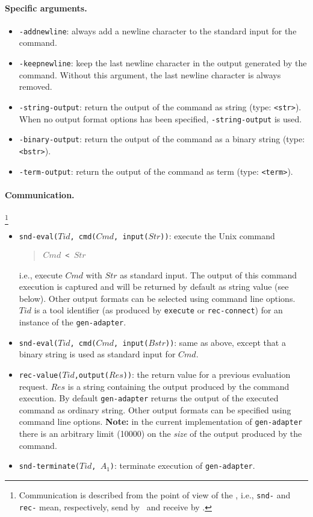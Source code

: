 \paragraph{Specific arguments.}
\begin{itemize}
\item {\tt -addnewline}: always add a newline character to the standard input for the command.
\item {\tt -keepnewline}: keep the last newline character
in the output generated by the command. Without this argument, 
the last newline character is always removed.
\item \texttt{-string-output}: return the output of the command as string
(type: \texttt{<str>}). When no output format options has been specified,
\texttt{-string-output} is used.
\item {\tt -binary-output}: return the output of the command
as a binary string (type: {\tt <bstr>}).
\item \texttt{-term-output}: return the output of the command as term (type:
\texttt{<term>}).
\end{itemize}

\paragraph{Communication.}  \hspace{-0.3cm}\footnote{Communication is described
from the point of view of the \TB, i.e., {\tt snd-} and {\tt rec-}
mean, respectively, send by \TB\ and receive by \TB.}

\begin{itemize}
\item {\tt snd-eval($Tid$, cmd($Cmd$, input($Str$))}: execute the Unix command
\begin{quote}
	{\tt $Cmd$ < $Str$}
\end{quote}
i.e., execute $Cmd$ with $Str$ as standard input. The output of this command execution
is captured and will be returned by default as string value (see below).
Other output formats can be selected using command line options.
$Tid$ is a tool identifier 
(as produced by {\tt execute} or {\tt rec-connect}) for an instance of the {\tt gen-adapter}.

\item {\tt snd-eval($Tid$, cmd($Cmd$, input($Bstr$))}: same as above, except that
a binary string is used as standard input for $Cmd$.

\item {\tt rec-value($Tid$,output($Res$))}: the return value for a previous evaluation request.
$Res$ is a string containing the output produced by the command execution.
By default \texttt{gen-adapter} returns the output of the executed command
as ordinary string. Other output formats can be specified using command line
options. {\bf Note:} in the current implementation of {\tt gen-adapter}
there is an arbitrary limit (10000) on the {\em size} of the output produced
by the command.

\item {\tt snd-terminate($Tid$, $A_1$)}: terminate execution of {\tt gen-adapter}.
\end{itemize}

